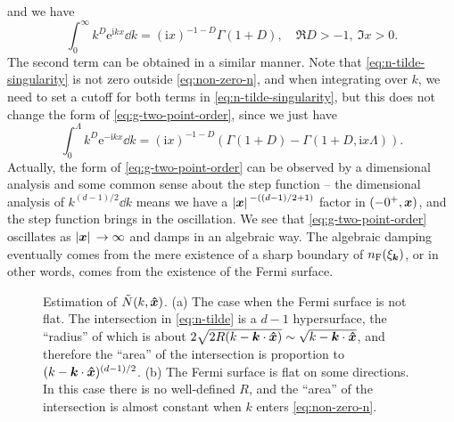 \documentclass[hyperref, a4paper]{article}
\newcommand*{\ii}{\mathrm{i}}
\newcommand*{\ee}{\mathrm{e}}
\begin{document}
and we have 
\[
    \int_0^\infty k^D \ee^{ \ii k x} \dd{k} = ( \ii x )^{-1-D} \Gamma(1+D), \quad \Re D > -1, \ \Im x > 0.
\]
The second term can be obtained in a similar manner.
Note that \eqref{eq:n-tilde-singularity} is not zero outside \eqref{eq:non-zero-n}, and when integrating 
over $k$, we need to set a cutoff for both terms in \eqref{eq:n-tilde-singularity}, but this does not 
change the form of \eqref{eq:g-two-point-order}, since we just have 
\[
    \int_0^\Lambda k^D \ee^{-\ii k x } \dd{k} = (\ii x)^{-1-D} (\Gamma(1+D) - \Gamma(1+D, \ii x \Lambda)).
\]
Actually, the form of \eqref{eq:g-two-point-order} can be observed by a dimensional analysis and some common
sense about the step function -- the dimensional analysis of $k^{(d-1)/2} \dd{k}$ means we have a 
$\abs*{\vb*{x}}^{-((d-1)/2+1)}$ factor in $(-0^+, \vb*{x})$, and the step function brings in the oscillation.
We see that \eqref{eq:g-two-point-order} oscillates as $\abs*{\vb*{x}} \to \infty$ and damps in an algebraic way.
The algebraic damping eventually comes from the mere existence of a sharp boundary of $n_\text{F}(\xi_{\vb*{k}})$,
or in other words, comes from the existence of the Fermi surface. 

\begin{figure}
    \centering
    
    \caption{Estimation of $\tilde{N}(k, \vu*{x})$. (a) The case when the Fermi surface is not flat. The intersection in \eqref{eq:n-tilde} is a $d-1$ hypersurface, the ``radius'' of which is about $2 \sqrt{2R(k - \vb*{k} \cdot \vu*{x})} \sim \sqrt{k - \vb*{k} \cdot \vu*{x}}$, and therefore the ``area'' of the intersection is proportion to $(k - \vb*{k} \cdot \vu*{x})^{(d-1)/2}$. (b) The Fermi surface is flat on some directions. In this case there is no well-defined $R$, and the ``area'' of the intersection is almost constant when $k$ enters \eqref{eq:non-zero-n}.}
    \label{fig:radius}
\end{figure}
\end{document}
